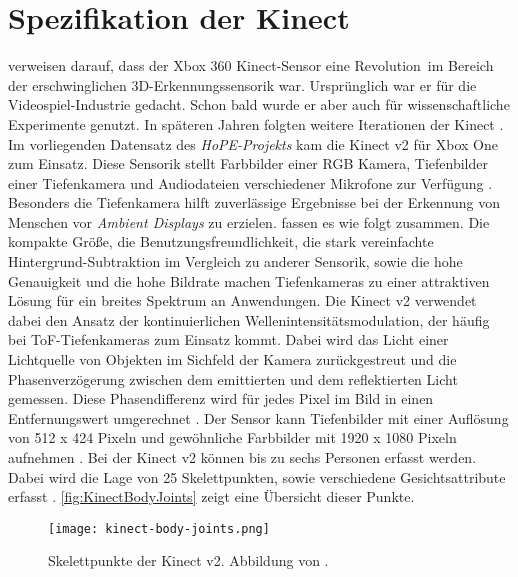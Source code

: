 \section{Spezifikation der Kinect}
\label{2-SpezifikationKinect}
\citet{tolgyessy_evaluation_2021} verweisen darauf,
dass der Xbox 360 Kinect-Sensor eine \glqq Revolution\grqq\ im Bereich der erschwinglichen 3D-Erkennungssensorik war.
Ursprünglich war er für die Videospiel-Industrie gedacht.
Schon bald wurde er aber auch für wissenschaftliche Experimente genutzt.
In späteren Jahren folgten weitere Iterationen der Kinect \citep{tolgyessy_evaluation_2021}.
Im vorliegenden Datensatz des \emph{HoPE-Projekts} kam die Kinect v2 für Xbox One zum Einsatz.
Diese Sensorik stellt Farbbilder einer \ac{RGB} Kamera, Tiefenbilder einer Tiefenkamera
und Audiodateien verschiedener Mikrofone zur Verfügung \citep{windows-developer-center_microsoft_corporation_human_2014}.
Besonders die Tiefenkamera hilft zuverlässige Ergebnisse bei der Erkennung von Menschen vor \emph{Ambient Displays} zu erzielen.
\citet{li_time-flight_2014} fassen es wie folgt zusammen.
Die kompakte Größe, die Benutzungsfreundlichkeit,
die stark vereinfachte Hintergrund-Subtraktion im Vergleich zu anderer Sensorik, sowie die hohe Genauigkeit
und die hohe Bildrate machen Tiefenkameras zu einer attraktiven Lösung für ein breites Spektrum an Anwendungen.
Die Kinect v2 verwendet dabei den Ansatz der kontinuierlichen Wellenintensitätsmodulation,
der häufig bei \ac{ToF}-Tiefenkameras zum Einsatz kommt.
Dabei wird das Licht einer Lichtquelle von Objekten im Sichfeld der Kamera zurückgestreut
und die Phasenverzögerung zwischen dem emittierten und dem reflektierten Licht gemessen.
Diese Phasendifferenz wird für jedes Pixel im Bild in einen Entfernungswert umgerechnet \citep{tolgyessy_evaluation_2021}.
Der Sensor kann Tiefenbilder mit einer Auflösung von 512 x 424 Pixeln
und gewöhnliche Farbbilder mit 1920 x 1080 Pixeln aufnehmen \citep{marin_multi-camera_2019}.
Bei der Kinect v2 können bis zu sechs Personen erfasst werden.
Dabei wird die Lage von 25 Skelettpunkten, sowie verschiedene Gesichtsattribute erfasst \citep{windows-developer-center_microsoft_corporation_human_2014}.
\autoref{fig:KinectBodyJoints} zeigt eine Übersicht dieser Punkte. 
\begin{figure}[ht]
  \begin{center}
  \texttt{[image: kinect-body-joints.png]}
  \end{center}
  \caption{Skelettpunkte der Kinect v2. Abbildung von \citet{windows-developer-center_microsoft_corporation_human_2014}.}
  \label{fig:KinectBodyJoints}
\end{figure}

